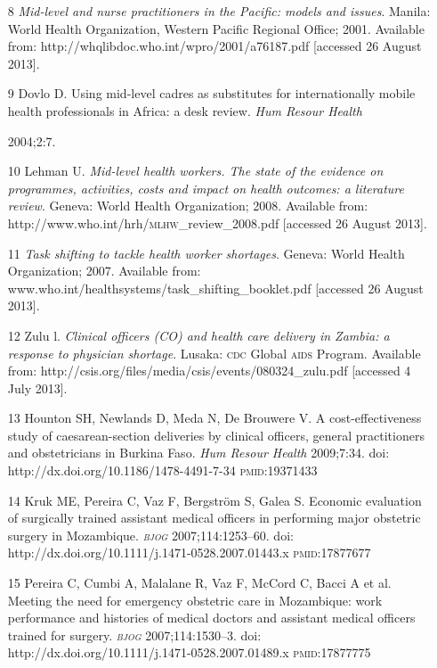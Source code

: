 \documentclass{article}
\begin{document}
\begin{itemize}
\item[8] \textit{Mid-level and nurse practitioners in the Pacific: models and
issues}. Manila: World Health Organization, Western Pacific Regional Office; 2001.
Available
from: http://whqlibdoc.who.int/wpro/2001/a76187.pdf [accessed 26 August 2013].

\item[9] Dovlo D. Using mid-level cadres as substitutes for internationally
mobile health
professionals in Africa: a desk review. \textit{Hum Resour Health}

2004;2:7.

\item[10] Lehman U. \textit{Mid-level health workers. The state of the evidence
on programmes,
activities, costs and impact on health outcomes: a literature review}. Geneva: World Health
Organization; 2008. Available from:
http://www.who.int/hrh/\textsc{mlhw}\_{}review\_{}2008.pdf [accessed 26 August
2013].

\item[11] \textit{Task shifting to tackle health worker shortages}. Geneva: World
Health Organization; 2007. Available from:
www.who.int/healthsystems/task\_{}shifting\_{}booklet.pdf
[accessed 26 August 2013].

\item[12] Zulu l. \textit{Clinical officers (CO) and health care delivery in
Zambia: a
response to physician shortage}. Lusaka: \textsc{cdc} Global \textsc{aids} Program. Available from:
http://csis.org/files/media/csis/events/080324\_{}zulu.pdf [accessed 4 July
2013].

\item[13] Hounton SH, Newlands D, Meda N, De Brouwere V. A cost-effectiveness
study of
caesarean-section deliveries by clinical officers, general practitioners and
obstetricians in
Burkina Faso. \textit{Hum Resour Health}
2009;7:34. doi:
http://dx.doi.org/10.1186/1478-4491-7-34 \textsc{pmid}:19371433

\item[14] Kruk ME, Pereira C, Vaz F, Bergström S, Galea S. Economic evaluation
of surgically
trained assistant medical officers in performing major obstetric surgery in
Mozambique.
\textit{\textsc{bjog}}
2007;114:1253–60. doi: http://dx.doi.org/10.1111/j.1471-0528.2007.01443.x
\textsc{pmid}:17877677

\item[15] Pereira C, Cumbi A, Malalane R, Vaz F, McCord C, Bacci A et al.
Meeting the need for
emergency obstetric care in Mozambique: work performance and histories of
medical doctors and
assistant medical officers trained for surgery. \textit{\textsc{bjog}}
2007;114:1530–3. doi:
http://dx.doi.org/10.1111/j.1471-0528.2007.01489.x \textsc{pmid}:17877775


\end{itemize}
\end{document}
